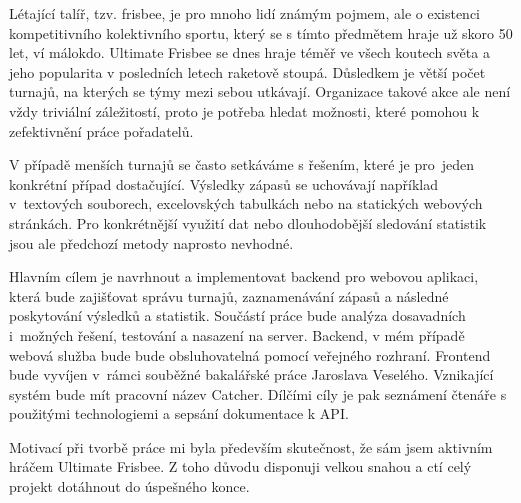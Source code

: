 \begin{introduction}
 Létající talíř, tzv. frisbee, je pro mnoho lidí známým pojmem, ale o existenci kompetitivního kolektivního sportu,
 který se s tímto předmětem hraje už skoro 50 let, ví málokdo. Ultimate Frisbee se dnes hraje téměř
 ve všech koutech světa a jeho popularita v posledních letech raketově stoupá. Důsledkem je větší počet turnajů, na kterých se týmy mezi sebou utkávají.
 Organizace takové akce ale není vždy triviální záležitostí, proto je potřeba hledat možnosti, které pomohou k zefektivnění práce pořadatelů.
 
 V případě menších turnajů se často setkáváme s řešením, které je pro~jeden konkrétní případ dostačující.
 Výsledky zápasů se uchovávají například v~textových souborech, excelovských tabulkách nebo na statických webových stránkách.
 Pro konkrétnější využití dat nebo dlouhodobější sledování statistik jsou ale předchozí metody naprosto nevhodné.
 
 Hlavním cílem je navrhnout a implementovat backend pro webovou aplikaci, která bude zajišťovat správu turnajů, zaznamenávání
 zápasů a následné poskytování výsledků a statistik. Sou\-částí práce bude analýza dosavadních
 i~možných řešení, testování a nasazení na server. Backend, v mém případě webová služba bude bude obsluhovatelná
 pomocí veřejného rozhraní. Frontend bude vyvíjen v~rámci souběžné bakalářské práce Jaroslava Veselého.
 Vznikající systém bude mít pracovní název Catcher. Dílčími cíly je pak seznámení čtenáře s použitými technologiemi
 a sepsání dokumentace k API.
 
 Motivací při tvorbě práce mi byla především skutečnost, že sám jsem aktivním hráčem Ultimate Frisbee.
 Z toho důvodu disponuji velkou snahou a ctí celý projekt dotáhnout do úspešného konce.
\end{introduction}
 
 
